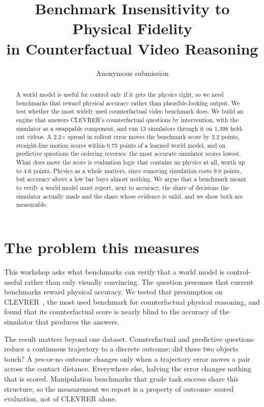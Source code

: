\documentclass[10pt,letterpaper]{article}
\title{\vspace{-3.5ex}Benchmark Insensitivity to Physical Fidelity\\
in Counterfactual Video Reasoning\vspace{-1ex}}
\author{Anonymous submission\vspace{-2ex}}
\date{}
\begin{document}
\maketitle

\begin{abstract}
\noindent
A world model is useful for control only if it gets the physics right, so we need benchmarks
that reward physical accuracy rather than plausible-looking output. We test whether the most
widely used counterfactual video benchmark does. We build an engine that answers CLEVRER's
counterfactual questions by intervention, with the simulator as a swappable component, and
run 13 simulators through it on 1,398 held-out videos. A 2.2$\times$ spread in rollout error
moves the benchmark score by 2.2 points, straight-line motion scores within 0.75 points of a
learned world model, and on predictive questions the ordering reverses: the most accurate
simulator scores lowest. What does move the score is evaluation logic that contains no
physics at all, worth up to 4.6 points. Physics as a whole matters, since removing simulation
costs 9.0 points, but accuracy above a low bar buys almost nothing. We argue that a benchmark
meant to verify a world model must report, next to accuracy, the share of decisions the
simulator actually made and the share whose evidence is valid, and we show both are
measurable.
\end{abstract}

\vspace{-1ex}
\section{The problem this measures}
\vspace{-0.5ex}

This workshop asks what benchmarks can verify that a world model is control-useful rather
than only visually convincing. The question presumes that current benchmarks reward physical
accuracy. We tested that presumption on CLEVRER~\cite{yi2020clevrer}, the most used benchmark
for counterfactual physical reasoning, and found that its counterfactual score is nearly
blind to the accuracy of the simulator that produces the answers.

The result matters beyond one dataset. Counterfactual and predictive questions reduce a
continuous trajectory to a discrete outcome: did these two objects touch? A yes-or-no outcome
changes only when a trajectory error moves a pair across the contact distance. Everywhere
else, halving the error changes nothing that is scored. Manipulation benchmarks that grade
task success share this structure, so the measurement we report is a property of outcome-
scored evaluation, not of CLEVRER alone.
\end{document}
